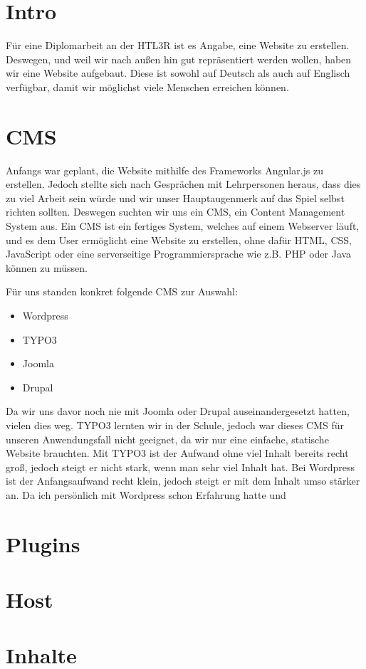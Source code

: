 \section{Intro}
Für eine Diplomarbeit an der HTL3R ist es Angabe, eine Website zu erstellen.
Deswegen, und weil wir nach außen hin gut repräsentiert werden wollen, haben wir eine Website aufgebaut.
Diese ist sowohl auf Deutsch als auch auf Englisch verfügbar, damit wir möglichst viele Menschen erreichen können.
\section{CMS}
Anfangs war geplant, die Website mithilfe des Frameworks Angular.js zu erstellen.
Jedoch stellte sich nach Gesprächen mit Lehrpersonen heraus, dass dies zu viel Arbeit sein würde und wir unser Hauptaugenmerk auf das Spiel selbst richten sollten.
Deswegen suchten wir uns ein CMS, ein Content Management System aus.
Ein CMS ist ein fertiges System, welches auf einem Webserver läuft, und es dem User ermöglicht eine Website zu erstellen, ohne dafür HTML, CSS, JavaScript oder eine serverseitige Programmiersprache wie z.B. PHP oder Java können zu müssen.

Für uns standen konkret folgende CMS zur Auswahl:
\begin{itemize}
    \item Wordpress
    \item TYPO3
    \item Joomla
    \item Drupal
\end{itemize}
Da wir uns davor noch nie mit Joomla oder Drupal auseinandergesetzt hatten, vielen dies weg.
TYPO3 lernten wir in der Schule, jedoch war dieses CMS für unseren Anwendungsfall nicht geeignet, da wir nur eine einfache, statische Website brauchten.
Mit TYPO3 ist der Aufwand ohne viel Inhalt bereits recht groß, jedoch steigt er nicht stark, wenn man sehr viel Inhalt hat.
Bei Wordpress ist der Anfangsaufwand recht klein, jedoch steigt er mit dem Inhalt umso stärker an.
Da ich persönlich mit Wordpress schon Erfahrung hatte und
\section{Plugins}
\section{Host}
\section{Inhalte}
